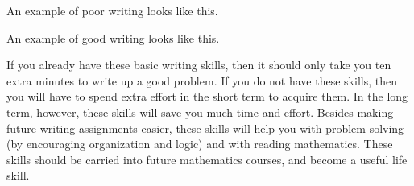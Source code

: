 \smallskip
\begin{badexample}
An example of poor writing looks like this.
\end{badexample}

\smallskip
\begin{goodexample}
An example of good writing looks like this.\\
\end{goodexample}

\smallskip
If you already have these basic writing skills, then it should only take you
ten extra minutes to write up a good problem. If you do not have
these skills, then you will have to spend extra effort in the short term to
acquire them. In the long term, however, these skills will save you much
time and effort. Besides making future writing assignments easier, these
skills will help you with problem-solving (by encouraging organization and
logic) and with reading mathematics. These skills should be carried into
future mathematics courses, and become a useful life skill.


